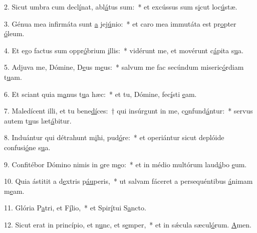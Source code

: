 2. Sicut umbra cum decl\uline{í}nat, abl\uline{á}tus sum:~* et excússus sum s\uline{i}cut loc\uline{ú}stæ.\par 
3. Génua mea infirmáta sunt \uline{a} jej\uline{ú}nio:~* et caro mea immutáta est pr\uline{o}pter \uline{ó}leum.\par 
4. Et ego factus sum oppr\uline{ó}brium \uline{i}llis:~* vidérunt me, et movérunt c\uline{á}pita s\uline{u}a.\par 
5. Adjuva me, Dómine, D\uline{e}us m\uline{e}us:~* salvum me fac secúndum miseric\uline{ó}rdiam t\uline{u}am.\par 
6. Et sciant quia m\uline{a}nus t\uline{u}a hæc:~* et tu, Dómine, fec\uline{í}sti \uline{e}am.\par 
7. Maledícent illi, et tu bene\uline{dí}ces:~† qui insúrgunt in me, c\uline{o}nfund\uline{á}ntur:~* servus autem t\uline{u}us læt\uline{á}bitur.\par 
8. Induántur qui détrahunt m\uline{i}hi, pud\uline{ó}re:~* et operiántur sicut deplóide confusi\uline{ó}ne s\uline{u}a.\par 
9. Confitébor Dómino nimis in \uline{o}re m\uline{e}o:~* et in médio multórum laud\uline{á}bo \uline{e}um.\par 
10. Quia ástitit a d\uline{e}xtris p\uline{áu}peris,~* ut salvam fáceret a persequéntibus \uline{á}nimam m\uline{e}am.\par 
11. Glória P\uline{a}tri, et F\uline{í}lio,~* et Spir\uline{í}tui S\uline{a}ncto.\par 
12. Sicut erat in princípio, et n\uline{u}nc, et s\uline{e}mper,~* et in sǽcula sæcul\uline{ó}rum. \uline{A}men.\par 
